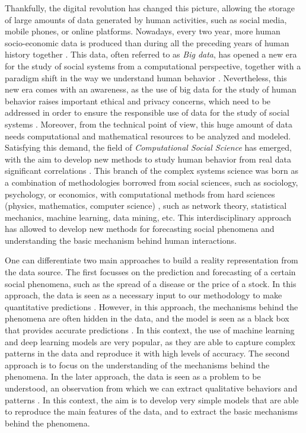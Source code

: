 Thankfully, the digital revolution has changed this picture, allowing the storage of large amounts of data generated by human activities, such as social media, mobile phones, or online platforms. Nowadays, every two year, more human socio-economic data is produced than during all the preceding years of human history together \cite{karsai2019computational}. This data, often referred to as \textit{Big data}, has opened a new era for the study of social systems from a computational perspective, together with a paradigm shift in the way we understand human behavior \cite{manyika-2011}. Nevertheless, this new era comes with an awareness, as the use of big data for the study of human behavior raises important ethical and privacy concerns, which need to be addressed in order to ensure the responsible use of data for the study of social systems \cite{boyd-2012}. Moreover, from the technical point of view, this huge amount of data needs computational and mathematical resources to be analyzed and modeled. Satisfying this demand, the field of \textit{Computational Social Science} has emerged, with the aim to develop new methods to study human behavior from real data significant correlations \cite{lazer-2009}. This branch of the complex systems science was born as a combination of methodologies borrowed from social sciences, such as sociology, psychology, or economics, with computational methods from hard sciences (physics, mathematics, computer science) \cite{watts-2007}, such as network theory, statistical mechanics, machine learning, data mining, etc. This interdisciplinary approach has allowed to develop new methods for forecasting social phenomena and understanding the basic mechanism behind human interactions. 

One can differentiate two main approaches to build a reality representation from the data source. The first focusses on the prediction and forecasting of a certain social phenomena, such as the spread of a disease or the price of a stock. In this approach, the data is seen as a necessary input to our methodology to make quantitative predictions \cite{lazer-2009}. However, in this approach, the mechanisms behind the phenomena are often hidden in the data, and the model is seen as a black box that provides accurate predictions \cite{rudin-2019}. In this context, the use of machine learning \cite{murphy-2012} and deep learning \cite{goodfellow-2016} models are  very popular, as they are able to capture complex patterns in the data and reproduce it with high levels of accuracy. The second approach is to focus on the understanding of the mechanisms behind the phenomena. In the later approach, the data is seen as a problem to be understood, an observation from which we can extract qualitative behaviors and patterns \cite{axelrod2006agent}. In this context, the aim is to develop very simple models that are able to reproduce the main features of the data, and to extract the basic mechanisms behind the phenomena.

